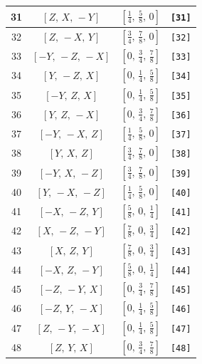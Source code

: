 \documentclass[fleqn,8pt]{jsarticle}
\begin{document}
\begin{longtable}{cccc}
31 & $\left[ Z,\, X,\, - Y \right]$ & $\left[ \frac{1}{4},\, \frac{5}{8},\, 0 \right]$ & {\tt [31]} \\ \hline
32 & $\left[ Z,\, - X,\, Y \right]$ & $\left[ \frac{3}{4},\, \frac{7}{8},\, 0 \right]$ & {\tt [32]} \\ \hline
33 & $\left[ - Y,\, - Z,\, - X \right]$ & $\left[ 0,\, \frac{3}{4},\, \frac{7}{8} \right]$ & {\tt [33]} \\ \hline
34 & $\left[ Y,\, - Z,\, X \right]$ & $\left[ 0,\, \frac{1}{4},\, \frac{5}{8} \right]$ & {\tt [34]} \\ \hline
35 & $\left[ - Y,\, Z,\, X \right]$ & $\left[ 0,\, \frac{1}{4},\, \frac{5}{8} \right]$ & {\tt [35]} \\ \hline
36 & $\left[ Y,\, Z,\, - X \right]$ & $\left[ 0,\, \frac{3}{4},\, \frac{7}{8} \right]$ & {\tt [36]} \\ \hline
37 & $\left[ - Y,\, - X,\, Z \right]$ & $\left[ \frac{1}{4},\, \frac{5}{8},\, 0 \right]$ & {\tt [37]} \\ \hline
38 & $\left[ Y,\, X,\, Z \right]$ & $\left[ \frac{3}{4},\, \frac{7}{8},\, 0 \right]$ & {\tt [38]} \\ \hline
39 & $\left[ - Y,\, X,\, - Z \right]$ & $\left[ \frac{3}{4},\, \frac{7}{8},\, 0 \right]$ & {\tt [39]} \\ \hline
40 & $\left[ Y,\, - X,\, - Z \right]$ & $\left[ \frac{1}{4},\, \frac{5}{8},\, 0 \right]$ & {\tt [40]} \\ \hline
41 & $\left[ - X,\, - Z,\, Y \right]$ & $\left[ \frac{5}{8},\, 0,\, \frac{1}{4} \right]$ & {\tt [41]} \\ \hline
42 & $\left[ X,\, - Z,\, - Y \right]$ & $\left[ \frac{7}{8},\, 0,\, \frac{3}{4} \right]$ & {\tt [42]} \\ \hline
43 & $\left[ X,\, Z,\, Y \right]$ & $\left[ \frac{7}{8},\, 0,\, \frac{3}{4} \right]$ & {\tt [43]} \\ \hline
44 & $\left[ - X,\, Z,\, - Y \right]$ & $\left[ \frac{5}{8},\, 0,\, \frac{1}{4} \right]$ & {\tt [44]} \\ \hline
45 & $\left[ - Z,\, - Y,\, X \right]$ & $\left[ 0,\, \frac{3}{4},\, \frac{7}{8} \right]$ & {\tt [45]} \\ \hline
46 & $\left[ - Z,\, Y,\, - X \right]$ & $\left[ 0,\, \frac{1}{4},\, \frac{5}{8} \right]$ & {\tt [46]} \\ \hline
47 & $\left[ Z,\, - Y,\, - X \right]$ & $\left[ 0,\, \frac{1}{4},\, \frac{5}{8} \right]$ & {\tt [47]} \\ \hline
48 & $\left[ Z,\, Y,\, X \right]$ & $\left[ 0,\, \frac{3}{4},\, \frac{7}{8} \right]$ & {\tt [48]} \\
\end{longtable}
\end{document}
